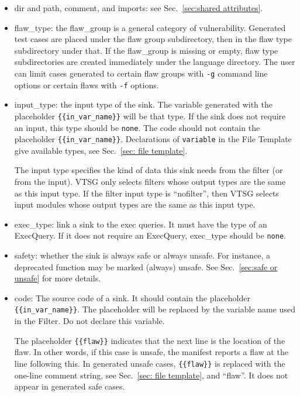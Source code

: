 \documentclass[12pt]{article}
\begin{document}
\begin{itemize}
    \item dir and path, comment, and imports: see Sec.~\ref{sec:shared attributes}.

    \item flaw\_type: the flaw\_group is a general category of vulnerability.
    Generated test cases are placed under the flaw group subdirectory, then
    in the flaw type subdirectory under that.  If the flaw\_group is missing or
    empty, flaw type subdirectories are created immediately under the language
    directory.
    The user can limit
    cases generated to certain flaw groups with \verb|-g| command
    line options or certain flaws with \verb|-f| options.
    
    \item input\_type: the input type of the sink. The variable
    generated with the placeholder \verb|{{in_var_name}}| will be 
    that type.  If the sink does not
    require an input, this type should be \verb|none|. The code 
    should not contain
    the placeholder \verb|{{in_var_name}}|.
    Declarations of \verb|variable| in the File Template give
    available types, see Sec.~\ref{sec: file template}.

    The input type specifies the kind of data this sink needs from the filter (or
    from the input).  VTSG only selects filters whose output types are the same as
    this input type.  If the filter input type is ``nofilter'',
    then VTSG selects input modules whose
    output types are the same as this input type.

    \item exec\_type: link a sink to the exec queries.  It must have 
    the type of
    an ExecQuery. If it does not require an ExecQuery, 
    exec\_type should be \verb|none|.

    \item safety: whether the sink is always safe or always unsafe.  For instance, a
      deprecated function may be marked (always) unsafe.
      See Sec.~\ref{sec:safe or unsafe}
      for more details.
    
    \item code: The source code of a sink. It should contain the placeholder
    \verb|{{in_var_name}}|.  The placeholder will be replaced by the variable
    name used in the Filter.  Do not declare this variable.

    The placeholder \verb|{{flaw}}| indicates that the next line is the location
    of the flaw.  In other words, if this case is unsafe, the manifest reports a
    flaw at the line following this.  In generated unsafe cases,
    \verb|{{flaw}}| is replaced with the one-line comment string,
    see Sec.~\ref{sec: file template}, and ``flaw''.
    It does not appear in generated safe cases.
\end{itemize}
\end{document}
